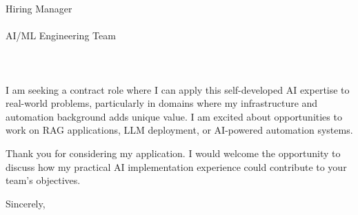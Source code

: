 \documentclass[11pt,a4paper]{letter}
\begin{document}
\begin{letter}{
    Hiring Manager\\\\
    AI/ML Engineering Team\\\\
    [Company Name]\\\\
    [Company Address]
}
I am seeking a contract role where I can apply this self-developed AI expertise to real-world problems, particularly in domains where my infrastructure and automation background adds unique value. I am excited about opportunities to work on RAG applications, LLM deployment, or AI-powered automation systems.

Thank you for considering my application. I would welcome the opportunity to discuss how my practical AI implementation experience could contribute to your team's objectives.

\closing{Sincerely,}

\end{letter}
\end{document}
